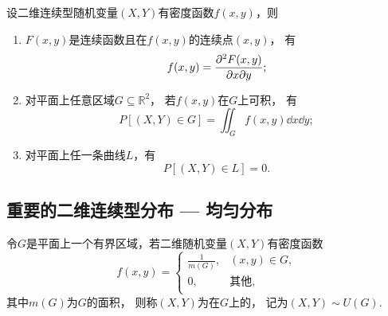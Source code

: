 \begin{theorem}
设二维连续型随机变量\((X,Y)\)有密度函数\(f(x,y)\)，则
\begin{enumerate}
	\item \(F(x,y)\)是连续函数且在\(f(x,y)\)的连续点\((x,y)\)，
	有\[
		f(x,y) = \pdv{F(x,y)}{x}{y};
	\]

	\item 对平面上任意区域\(G \subseteq \mathbb{R}^2\)，
	若\(f(x,y)\)在\(G\)上可积，
	有\[
		P\left[(X,Y) \in G\right] = \iint_G{f(x,y) \dd{x}\dd{y}};
	\]

	\item 对平面上任一条曲线\(L\)，有\[
		P\left[(X,Y) \in L\right] = 0.
	\]
\end{enumerate}
\end{theorem}

\subsection{重要的二维连续型分布 --- 均匀分布}
\begin{definition}
令\(G\)是平面上一个有界区域，若二维随机变量\((X,Y)\)有密度函数\[
	f(x,y) = \left\{ \begin{array}{ll}
		\frac{1}{m(G)}, & (x,y) \in G, \\
		0, & \text{其他}, \\
	\end{array} \right.
\]
其中\(m(G)\)为\(G\)的面积，
则称\((X,Y)\)为在\(G\)上的，
记为\((X,Y) \sim U(G)\).
\end{definition}
